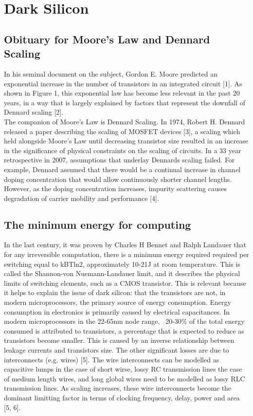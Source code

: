 	
	\section{Dark Silicon}
		\subsection{Obituary for Moore’s Law and Dennard Scaling}
			In his seminal document on the subject, Gordon E. Moore predicted an exponential increase in the number of transistors in an integrated circuit [1]. As shown in Figure 1, this exponential law has become less relevant in the past 20 years, in a way that is largely explained by factors that represent the downfall of Dennard scaling [2].  \\
			The companion of Moore’s Law is Dennard Scaling. In 1974, Robert H. Dennard released a paper describing the scaling of MOSFET devices [3], a scaling which held alongside Moore’s Law until decreasing transistor size resulted in an increase in the significance of physical constraints on the scaling of circuits. In a 33 year retrospective in 2007, assumptions that underlay Dennards scaling failed. For example, Dennard assumed that there would be a continual increase in channel doping concentration that would allow continuously shorter channel lengths. However, as the doping concentration increases, impurity scattering causes degradation of carrier mobility and performance [4].
			
		\subsection{The minimum energy for computing}
			In the last century, it was proven by Charles H Bennet and Ralph Landauer that for any irreversible computation, there is a minimum energy required required per switching equal to kBTln2, approximately 10-21J at room temperature. This is called the Shannon-von Nuemann-Landauer limit, and it describes the physical limits of switching elements, such as a CMOS transistor. This is relevant because it helps to explain the issue of dark silicon: that the transistors are not, in modern microprocessors, the primary source of energy consumption. Energy consumption in electronics is primarily caused by electrical capacitances. In modern microprocessors in the 22-65nm node range, ~20-30\% of the total energy consumed is attributed to transistors, a percentage that is expected to reduce as transistors become smaller. This is caused by an inverse relationship between leakage currents and  transistors size. The other significant losses are due to interconnects (e.g. wires) [5]. The wire interconnects can be modelled as capacitive lumps in the case of short wirse, lossy RC transmission lines the case of medium length wires, and long global wires need to be modelled as lossy RLC transmission lines. As scaling increases, these wire interconnects become the dominant limitting factor in terms of clocking frequency, delay, power and area [5, 6].
		
